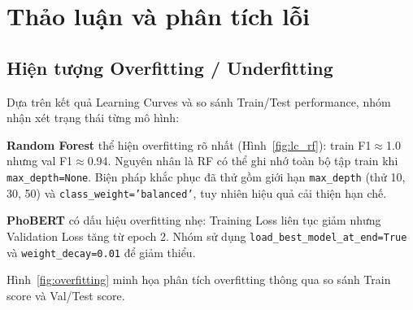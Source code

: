 \section{Thảo luận và phân tích lỗi}

\subsection{Hiện tượng Overfitting / Underfitting}

Dựa trên kết quả Learning Curves và so sánh Train/Test performance, nhóm nhận xét trạng thái từng mô hình:

\begin{table}[H]
\centering
\caption{Phân tích Overfitting / Underfitting và biện pháp khắc phục}
\label{tab:overfitting}
\end{table}

\textbf{Random Forest} thể hiện overfitting rõ nhất (Hình~\ref{fig:lc_rf}): train F1$\approx$1.0 nhưng val F1$\approx$0.94. Nguyên nhân là RF có thể ghi nhớ toàn bộ tập train khi \texttt{max\_depth=None}. Biện pháp khắc phục đã thử gồm giới hạn \texttt{max\_depth} (thử 10, 30, 50) và \texttt{class\_weight='balanced'}, tuy nhiên hiệu quả cải thiện hạn chế.

\textbf{PhoBERT} có dấu hiệu overfitting nhẹ: Training Loss liên tục giảm nhưng Validation Loss tăng từ epoch 2. Nhóm sử dụng \texttt{load\_best\_model\_at\_end=True} và \texttt{weight\_decay=0.01} để giảm thiểu.

Hình~\ref{fig:overfitting} minh họa phân tích overfitting thông qua so sánh Train score và Val/Test score.

